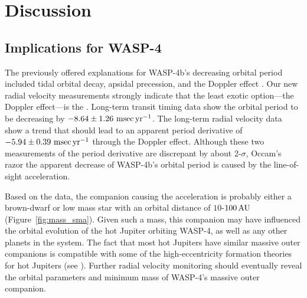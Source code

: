 \documentclass[12pt,twocolumn,tighten,trackchanges]{aastex62}
\begin{document}
\section{Discussion}
\label{sec:discussion}

\subsection{Implications for WASP-4}

The previously offered explanations for WASP-4b's decreasing orbital
period included tidal orbital decay, apsidal precession, and the
Doppler effect \citep{bouma_wasp4b_2019}.  Our new radial velocity
measurements strongly indicate that the least exotic option---the
Doppler effect---is the .  Long-term transit timing data show the orbital
period to be decreasing by $- 8.64 \pm 1.26~{\rm msec}\,{\rm
yr}^{-1}$.  The long-term radial velocity data show a trend that
should lead to an apparent period derivative of $-5.94 \pm 0.39~{\rm
msec}\,{\rm yr}^{-1}$ through the Doppler effect.  Although these two
measurements of the period derivative are discrepant by about
2-$\sigma$, Occam's razor  the
apparent decrease of WASP-4b's orbital period is caused
 by the line-of-sight acceleration.

Based on the data, the companion causing the acceleration is probably
either a brown-dwarf or low mass star with an orbital distance of
$10$-$100\,{\rm AU}$ (Figure~\ref{fig:mass_sma}).  Given such a mass,
this companion may have influenced the orbital evolution of the hot
Jupiter orbiting WASP-4, as well as any other planets in the system.
The fact that most hot Jupiters have similar massive outer companions
\citep{knutson_friends_2014,bryan_statistics_2016} is compatible with
some of the high-eccentricity formation theories for hot Jupiters (see
\citealt{dawson_johnson_2018}).  Further radial velocity monitoring
should eventually reveal the orbital parameters and minimum mass of
WASP-4's massive outer companion.
\end{document}
